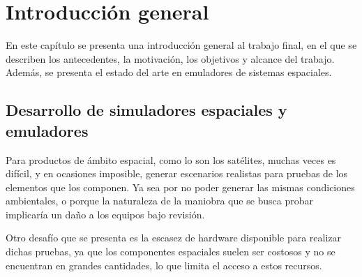 
\chapter{Introducción general} %

\label{Chapter1} %
\label{IntroGeneral}


\newcommand{\keyword}[1]{\textbf{#1}}
\newcommand{\tabhead}[1]{\textbf{#1}}
\newcommand{\code}[1]{\texttt{#1}}
\newcommand{\file}[1]{\texttt{\bfseries#1}}
\newcommand{\option}[1]{\texttt{\itshape#1}}
\newcommand{\grados}{$^{\circ}$}


En este capítulo se presenta una introducción general al trabajo final, en el que se describen los antecedentes, la motivación, los objetivos y alcance del trabajo. Además, se presenta el estado del arte en emuladores de sistemas espaciales.

\section{Desarrollo de simuladores espaciales y emuladores}
\label{sec:desarrollo_simuladores_emuladores}


Para productos de ámbito espacial, como lo son los satélites, muchas veces es difícil, y en ocasiones imposible, generar escenarios realistas para pruebas de los elementos que los componen. Ya sea por no poder generar las mismas condiciones ambientales, o porque la naturaleza de la maniobra que se busca probar implicaría un daño a los equipos bajo revisión.

Otro desafío que se presenta es la escasez de hardware disponible para realizar dichas pruebas, ya que los componentes espaciales suelen ser costosos y no se encuentran en grandes cantidades, lo que limita el acceso a estos recursos.

